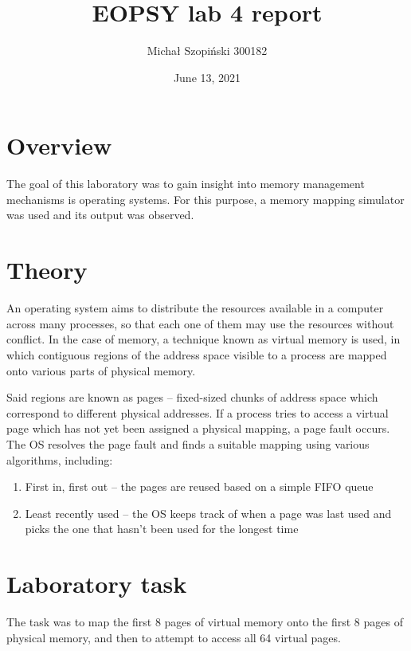 \documentclass{article}
\begin{document}
    \title{EOPSY lab 4 report}
    \author{Michał Szopiński 300182}
    \date{June 13, 2021}
    \maketitle
    
    \section{Overview}
    
    The goal of this laboratory was to gain insight into memory management
	mechanisms is operating systems. For this purpose, a memory mapping
	simulator was used and its output was observed.
	
	\section{Theory}
	
	An operating system aims to distribute the resources available in a
	computer across many processes, so that each one of them may use the
	resources without conflict. In the case of memory, a technique known as
	virtual memory is used, in which contiguous regions of the address space
	visible to a process are mapped onto various parts of physical memory.
	
	Said regions are known as pages -- fixed-sized chunks of
	address space which correspond to different physical addresses. If a
	process tries to access a virtual page which has not yet been assigned
	a physical mapping, a page fault occurs. The OS resolves the page fault and
	finds a suitable mapping using various algorithms, including:
	
	\begin{enumerate}
        \item First in, first out -- the pages are reused based on a simple
		FIFO queue
        \item Least recently used -- the OS keeps track of when a page was last
		used and picks the one that hasn't been used for the longest time
    \end{enumerate}
	
	\section{Laboratory task}
	
	The task was to map the first 8 pages of virtual memory onto the first 8
	pages of physical memory, and then to attempt to access all 64 virtual
	pages.
    
\end{document}
